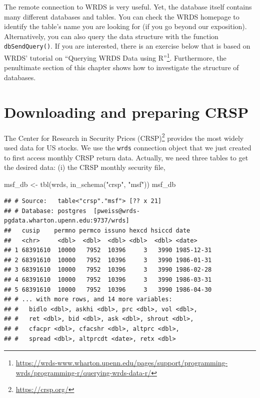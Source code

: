 \documentclass[
]{krantz}
\newenvironment{Shaded}{\begin{snugshade}}{\end{snugshade}}
\newcommand{\FunctionTok}[1]{\textcolor[rgb]{0,0,0}{#1}}
\newcommand{\NormalTok}[1]{#1}
\newcommand{\OtherTok}[1]{\textcolor[rgb]{0.37,0.37,0.37}{#1}}
\newcommand{\StringTok}[1]{\textcolor[rgb]{0.5,0.5,0.5}{#1}}
\renewcommand{\href}[2]{#2\footnote{\url{#1}}}
\begin{document}
The remote connection to WRDS is very useful. Yet, the database itself contains many different databases and tables. You can check the WRDS homepage to identify the table's name you are looking for (if you go beyond our exposition). Alternatively, you can also query the data structure with the function \texttt{dbSendQuery()}. If you are interested, there is an exercise below that is based on WRDS' tutorial on \href{https://wrds-www.wharton.upenn.edu/pages/support/programming-wrds/programming-r/querying-wrds-data-r/}{``Querying WRDS Data using R''}. Furthermore, the penultimate section of this chapter shows how to investigate the structure of databases.

\hypertarget{downloading-and-preparing-crsp}{%
\section{Downloading and preparing CRSP}\label{downloading-and-preparing-crsp}}

\href{https://crsp.org/}{The Center for Research in Security Prices (CRSP)} provides the most widely used data for US stocks. We use the \texttt{wrds} connection object that we just created to first access monthly CRSP return data. Actually, we need three tables to get the desired data: (i) the CRSP monthly security file,

\begin{Shaded}
\begin{Highlighting}[]
\NormalTok{msf\_db }\OtherTok{\textless{}{-}} \FunctionTok{tbl}\NormalTok{(wrds, }\FunctionTok{in\_schema}\NormalTok{(}\StringTok{"crsp"}\NormalTok{, }\StringTok{"msf"}\NormalTok{))}
\NormalTok{msf\_db}
\end{Highlighting}
\end{Shaded}

\begin{verbatim}
## # Source:   table<"crsp"."msf"> [?? x 21]
## # Database: postgres  [pweiss@wrds-pgdata.wharton.upenn.edu:9737/wrds]
##   cusip    permno permco issuno hexcd hsiccd date      
##   <chr>     <dbl>  <dbl>  <dbl> <dbl>  <dbl> <date>    
## 1 68391610  10000   7952  10396     3   3990 1985-12-31
## 2 68391610  10000   7952  10396     3   3990 1986-01-31
## 3 68391610  10000   7952  10396     3   3990 1986-02-28
## 4 68391610  10000   7952  10396     3   3990 1986-03-31
## 5 68391610  10000   7952  10396     3   3990 1986-04-30
## # ... with more rows, and 14 more variables:
## #   bidlo <dbl>, askhi <dbl>, prc <dbl>, vol <dbl>,
## #   ret <dbl>, bid <dbl>, ask <dbl>, shrout <dbl>,
## #   cfacpr <dbl>, cfacshr <dbl>, altprc <dbl>,
## #   spread <dbl>, altprcdt <date>, retx <dbl>
\end{verbatim}
\end{document}
